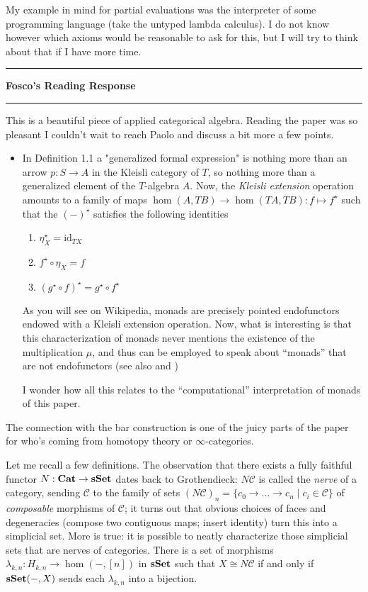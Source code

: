 \documentclass{amsart}
\newcommand{\iam}[1]{
  \vspace{0.25em}
  \hrule
  \vspace{0.25em}
  \textbf{{#1}'s Reading Response}
  \vspace{0.25em}
  \hrule
  \vspace{1em}
}
\begin{document}
My example in mind for partial evaluations was the interpreter of some
programming language (take the untyped lambda calculus). I do not know
however which axioms would be reasonable to ask for this, but I will try
to think about that if I have more time.

\iam{Fosco} This is a beautiful piece of applied categorical algebra. Reading the paper was so pleasant I couldn't wait to reach Paolo and discuss a bit more a few points.

\begin{itemize}
\item In Definition 1.1 a "generalized formal expression" is nothing more than an arrow $p : S\to A$ in the Kleisli category of $T$, so nothing more than a generalized element of the $T$-algebra $A$. Now, the \emph{Kleisli extension} operation amounts to a family of maps $\hom(A, TB)\to \hom(TA,TB) : f\mapsto f^\star$ such that the $(-)^\star$ satisfies the following identities
\begin{enumerate}
\item $\eta_X^\star = \mathrm{id}_{TX}$
\item $f^\star\circ\eta_X = f$
\item $(g^\star\circ f)^\star =  g^\star \circ f^\star$
\end{enumerate}
As you will see on Wikipedia, monads are precisely pointed endofunctors endowed with a Kleisli extension operation. Now, what is interesting is that this characterization of monads never mentions the existence of the multiplication $\mu$, and thus can be employed to speak about ``monads'' that are not endofunctors \cite{notendo} (see also \cite{gambo} and \cite[Appendix A]{yosegi})

I wonder how all this relates to the ``computational'' interpretation of monads of this paper.
\end{itemize}
The connection with the bar construction is one of the juicy parts of the paper for who's coming from homotopy theory or $\infty$-categories.

Let me recall a few definitions. The observation that there exists a fully faithful functor $N : {\bf Cat} \to {\bf sSet}$ dates back to Grothendieck: $N\mathcal C$ is called the \emph{nerve} of a category, sending $\mathcal C$ to the family of sets $(N\mathcal C)_n = \{c_0\to \dots \to c_n \mid c_i \in \mathcal C\}$ of \emph {composable} morphisms of $\mathcal C$; it turns out that obvious choices of faces and degeneracies (compose two contiguous maps; insert identity) turn this into a simplicial set. More is true: it is possible to neatly characterize those simplicial sets that are nerves of categories. There is a set of morphisms $\lambda_{k,n} : H_{k,n} \to \hom(-,[n])$ in $\bf sSet$ such that $X\cong N\mathcal C$ if and only if ${\bf sSet}(-,X)$ sends each $\lambda_{k,n}$ into a bijection.
\end{document}
